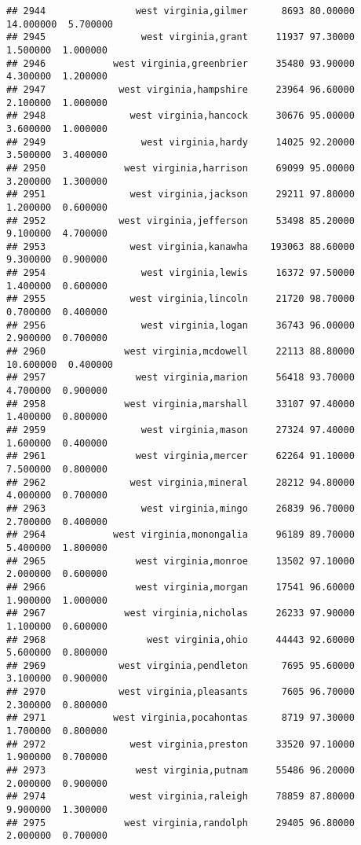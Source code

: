 \documentclass[
]{article}
\begin{document}
\begin{verbatim}
## 2944                west virginia,gilmer      8693 80.00000 14.000000  5.700000
## 2945                 west virginia,grant     11937 97.30000  1.500000  1.000000
## 2946            west virginia,greenbrier     35480 93.90000  4.300000  1.200000
## 2947             west virginia,hampshire     23964 96.60000  2.100000  1.000000
## 2948               west virginia,hancock     30676 95.00000  3.600000  1.000000
## 2949                 west virginia,hardy     14025 92.20000  3.500000  3.400000
## 2950              west virginia,harrison     69099 95.00000  3.200000  1.300000
## 2951               west virginia,jackson     29211 97.80000  1.200000  0.600000
## 2952             west virginia,jefferson     53498 85.20000  9.100000  4.700000
## 2953               west virginia,kanawha    193063 88.60000  9.300000  0.900000
## 2954                 west virginia,lewis     16372 97.50000  1.400000  0.600000
## 2955               west virginia,lincoln     21720 98.70000  0.700000  0.400000
## 2956                 west virginia,logan     36743 96.00000  2.900000  0.700000
## 2960              west virginia,mcdowell     22113 88.80000 10.600000  0.400000
## 2957                west virginia,marion     56418 93.70000  4.700000  0.900000
## 2958              west virginia,marshall     33107 97.40000  1.400000  0.800000
## 2959                 west virginia,mason     27324 97.40000  1.600000  0.400000
## 2961                west virginia,mercer     62264 91.10000  7.500000  0.800000
## 2962               west virginia,mineral     28212 94.80000  4.000000  0.700000
## 2963                 west virginia,mingo     26839 96.70000  2.700000  0.400000
## 2964            west virginia,monongalia     96189 89.70000  5.400000  1.800000
## 2965                west virginia,monroe     13502 97.10000  2.000000  0.600000
## 2966                west virginia,morgan     17541 96.60000  1.900000  1.000000
## 2967              west virginia,nicholas     26233 97.90000  1.100000  0.600000
## 2968                  west virginia,ohio     44443 92.60000  5.600000  0.800000
## 2969             west virginia,pendleton      7695 95.60000  3.100000  0.900000
## 2970             west virginia,pleasants      7605 96.70000  2.300000  0.800000
## 2971            west virginia,pocahontas      8719 97.30000  1.700000  0.800000
## 2972               west virginia,preston     33520 97.10000  1.900000  0.700000
## 2973                west virginia,putnam     55486 96.20000  2.000000  0.900000
## 2974               west virginia,raleigh     78859 87.80000  9.900000  1.300000
## 2975              west virginia,randolph     29405 96.80000  2.000000  0.700000

\end{verbatim}
\end{document}
